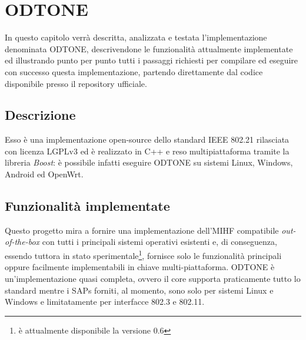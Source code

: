 \chapter{ODTONE}

In questo capitolo verrà descritta, analizzata e testata l'implementazione denominata ODTONE\cite{odtone}, descrivendone le funzionalità attualmente implementate ed illustrando punto per punto tutti i passaggi richiesti per compilare ed eseguire con successo questa implementazione, partendo direttamente dal codice disponibile presso il repository ufficiale.

\section{Descrizione}
Esso è una implementazione open-source dello standard IEEE 802.21 rilasciata con licenza LGPLv3\cite{lgpl} ed è realizzato in C++ e reso multipiattaforma tramite la libreria {\em Boost}\cite{boost}: è possibile infatti eseguire ODTONE su sistemi Linux, Windows, Android ed OpenWrt.

\section{Funzionalità implementate}

Questo progetto mira a fornire una implementazione dell'MIHF compatibile {\em out-of-the-box} con tutti i principali sistemi operativi esistenti e, di conseguenza, essendo tuttora in stato sperimentale\footnote{è attualmente disponibile la versione 0.6}, fornisce solo le funzionalità principali oppure facilmente implementabili in chiave multi-piattaforma. ODTONE è un'implementazione quasi completa, ovvero il core supporta praticamente tutto lo standard mentre i SAPs forniti, al momento, sono solo per sistemi Linux e Windows e limitatamente per interfacce 802.3 e 802.11.

